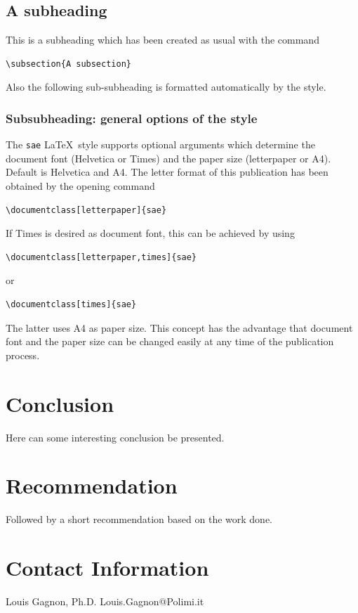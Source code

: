 \documentclass[letterpaper,times]{sae}
\begin{document}
\subsection{A subheading}
This is a subheading which has been created as usual with the command
\begin{verbatim}
\subsection{A subsection}
\end{verbatim}
Also the following sub-subheading is formatted automatically by the style. 
\subsubsection{Subsubheading: general options of the style}
The \texttt{sae} \LaTeX\ style supports optional arguments which determine the
document font (Helvetica or Times) and the paper size (letterpaper or
A4). Default is Helvetica and A4. The letter format of this publication has
been obtained by the opening command
\begin{verbatim}
\documentclass[letterpaper]{sae}
\end{verbatim}
If Times is desired as document font, this can be achieved by using
\begin{verbatim}
\documentclass[letterpaper,times]{sae}
\end{verbatim}
or
\begin{verbatim}
\documentclass[times]{sae}
\end{verbatim}
The latter uses A4 as paper size. This concept has the advantage that document
font and the paper size can be changed easily at any time of the publication
process. 


\section{Conclusion}
\label{sec:concl}
Here can some interesting conclusion be presented.


\section{Recommendation}
\label{sec:recom}
Followed by a short recommendation based on the work done.




\section{Contact Information}
Louis Gagnon, Ph.D. \newline
Louis.Gagnon@Polimi.it
\end{document}
